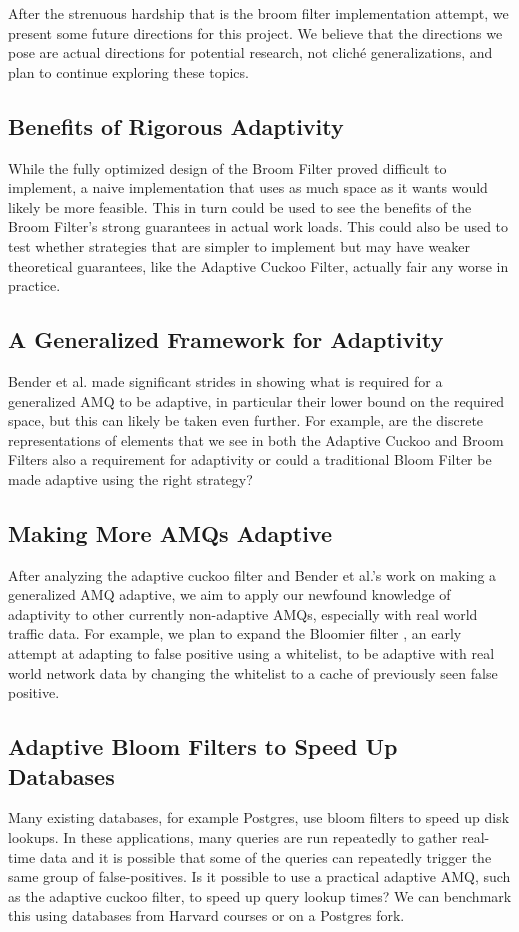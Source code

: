 \documentclass[../paper.tex]{subfiles}
\begin{document}
After the strenuous hardship that is the broom filter implementation attempt,
we present some future directions for this project. We believe that the directions
we pose are actual directions for potential research, not clich\'e generalizations,
and plan to continue exploring these topics.

\subsection{Benefits of Rigorous Adaptivity}
While the fully optimized design of the Broom Filter proved difficult to implement,
a naive implementation that uses as much space as it wants would likely be 
more feasible.  This in turn could be used to see the benefits of the Broom Filter's
strong guarantees in actual work loads.  This could also be used to test whether 
strategies that are simpler to implement but may have weaker theoretical 
guarantees, like the Adaptive Cuckoo Filter, actually fair any worse in practice.  

\subsection{A Generalized Framework for Adaptivity}
Bender et al. \cite{broom-filter} made significant strides in showing what is required
for a generalized AMQ to be adaptive, in particular their lower bound on the required 
space, but this can likely be taken even further.  For example, are the discrete 
representations of elements that we see in both the Adaptive Cuckoo and Broom 
Filters also a requirement for adaptivity or could a traditional Bloom Filter  be made 
adaptive using the right strategy?

\subsection{Making More AMQs Adaptive}
After analyzing the adaptive cuckoo filter \cite{adaptive-cuckoo} and Bender et al.'s work on
making a generalized AMQ adaptive, we aim to apply our newfound knowledge of adaptivity to other
currently non-adaptive AMQs, especially with real world traffic data. For example, we plan to
expand the Bloomier filter \cite{bloomier-filter}, an early attempt at adapting to false positive
using a whitelist, to be adaptive with real world network data by changing the whitelist to a
cache of previously seen false positive.

\subsection{Adaptive Bloom Filters to Speed Up Databases}
Many existing databases, for example Postgres, use bloom filters to speed up disk lookups. In these
applications, many queries are run repeatedly to gather real-time data and it is possible that
some of the queries can repeatedly trigger the same group of false-positives. Is it possible to use
a practical adaptive AMQ, such as the adaptive cuckoo filter, to speed up query lookup times? We can
benchmark this using databases from Harvard courses or on a Postgres fork.
\end{document}
